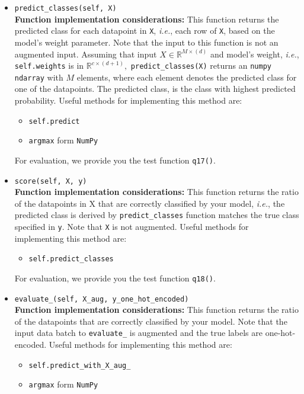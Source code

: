 \documentclass{article}
\theoremstyle{definition}
\begin{document}
\begin{itemize}
{		For evaluation, we provide you the test function \verb|q16()|.}
	\item{\verb|predict_classes(self, X)|\\\textbf{Function implementation considerations:}
			This function returns the predicted class for each datapoint in \verb|X|, \textit{i.e.}, each row of \verb|X|, based on the model's weight parameter. Note that the input to this function is not an augmented input. Assuming that input $X \in \mathbb{R}^{M \times (d)}$ and model's weight, \textit{i.e.}, \verb|self.weights| is in $\mathbb{R}^{c \times (d+1)},$ \verb|predict_classes(X)| returns an \verb|numpy ndarray| with $M$ elements, where each element denotes the predicted class for one of the datapoints. The predicted class, is the class with highest predicted probability. Useful methods for implementing this method are:
			\begin{itemize}
				\item \verb|self.predict|
				\item \verb|argmax| form \verb|NumPy|
			\end{itemize}
			
			For evaluation, we provide you the test function \verb|q17()|.}
		\item{\verb|score(self, X, y)|\\\textbf{Function implementation considerations:}
			This function returns the ratio of the datapoints in X that are correctly classified by your model, \textit{i.e.}, the predicted class is derived by \verb|predict_classes| function matches the true class specified in \verb|y|. Note that \verb|X| is not augmented.  Useful methods for implementing this method are:
			\begin{itemize}
				\item \verb|self.predict_classes|
			\end{itemize}
			
			For evaluation, we provide you the test function \verb|q18()|.}
			\item{\verb|evaluate_(self, X_aug, y_one_hot_encoded)|\\\textbf{Function implementation considerations:}
				This function returns the ratio of the datapoints that are correctly classified by your model. Note that the input data batch to \verb|evaluate_| is augmented and the true labels are one-hot-encoded. Useful methods for implementing this method are:
				\begin{itemize}
					\item \verb|self.predict_with_X_aug_|
					\item \verb|argmax| form \verb|NumPy|
				\end{itemize}
				
}
\end{itemize}
\end{document}
